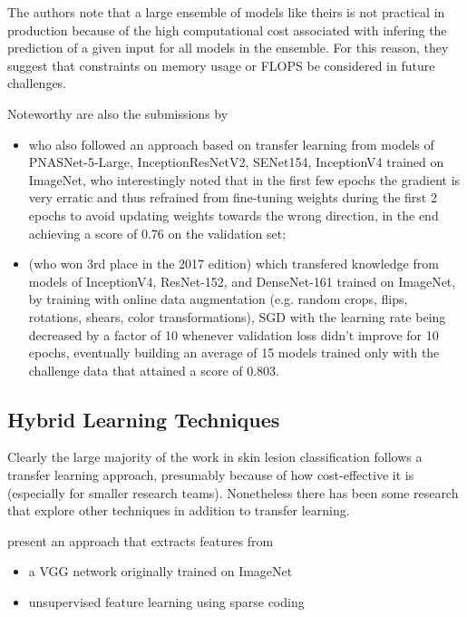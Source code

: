 The authors note that a large ensemble of models like theirs is not practical in production because of the high computational cost associated with infering the prediction of a given input for all models in the ensemble. For this reason, they suggest that constraints on memory usage or \ac{FLOPS} be considered in future challenges.

Noteworthy are also the submissions by

\begin{itemize}
    \item \citeauthor{isic2018milton} \cite{isic2018milton} who also followed an approach based on transfer learning from models of PNASNet-5-Large, InceptionResNetV2, SENet154, InceptionV4 trained on ImageNet, who interestingly noted that in the first few epochs the gradient is very erratic and thus refrained from fine-tuning weights during the first 2 epochs to avoid updating weights towards the wrong direction, in the end achieving a score of 0.76 on the validation set;
    \item \citeauthor{isic2018bissoto} \cite{isic2018bissoto} (who won 3rd place in the 2017 edition) which transfered knowledge from models of InceptionV4, ResNet-152, and DenseNet-161 trained on ImageNet, by training with online data augmentation (e.g. random crops, flips, rotations, shears, color transformations), \ac{SGD} with the learning rate being decreased by a factor of 10 whenever validation loss didn't improve for 10 epochs, eventually building an average of 15 models trained only with the challenge data that attained a score of 0.803.
\end{itemize}

\subsection{Hybrid Learning Techniques}

Clearly the large majority of the work in skin lesion classification follows a transfer learning approach, presumably because of how cost-effective it is (especially for smaller research teams). Nonetheless there has been some research that explore other techniques in addition to transfer learning.

\citeauthor{hybrid2} \cite{hybrid2} present an approach that extracts features from

\begin{itemize}
    \item a \ac{VGG} network originally trained on ImageNet
    \item unsupervised feature learning using sparse coding
\end{itemize}

